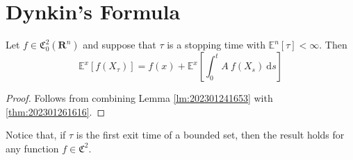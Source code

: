 \section{Dynkin's Formula}

\begin{theorem}
    Let $f \in \mathfrak{C}_0^2(\textbf{R}^n)$ and suppose that $\tau$ is a stopping time with $\mathbb{E}^n[\tau] < \infty$. Then 
    \begin{equation}\label{thm:dynkin-formula}
        \mathbb{E}^x [f(X_\tau)] = f(x) + \mathbb{E}^x \left[ \int_0^t A~f(X_s) ~\mathrm{d}s \right]
    \end{equation}
\end{theorem}

\begin{proof}
    Follows from combining Lemma \ref{lm:202301241653} with \eqref{thm:202301261616}.
\end{proof}

Notice that, if $\tau$ is the first exit time of a bounded set, then the result holds for any function $f \in \mathfrak{C}^2$.

